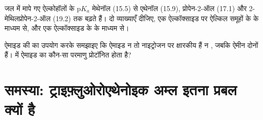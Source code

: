 \begin{exercise}[$\star\star\star$]\label{exo:b1:electronic-effects:11}
जल में मापे गए ऐल्कोहॉलों के $\mathrm{p}K_a$ मेथेनॉल
(15.5) से एथेनॉल (15.9), प्रोपेन-2-ऑल (17.1) और 2-मेथिलप्रोपेन-2-ऑल
(19.2) तक बढ़ते हैं। दो व्याख्याएँ दीजिए, एक ऐल्कॉक्साइड पर ऐल्किल समूहों के
 के माध्यम से, और एक ऐल्कॉक्साइड के  के माध्यम से।
\end{exercise}

\begin{exercise}[$\star\star\star$]\label{exo:b1:electronic-effects:12}
ऐमाइड की  का उपयोग करके समझाइए कि ऐमाइड न तो नाइट्रोजन पर क्षारकीय हैं
न , जबकि ऐमीन दोनों हैं।
 में ऐमाइड का कौन-सा परमाणु प्रोटॉनित होता है?
\end{exercise}

\section{समस्या: ट्राइफ़्लुओरोएथेनोइक अम्ल इतना प्रबल क्यों है}

